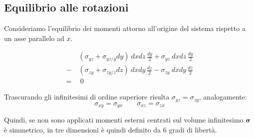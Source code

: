 \subsection*{Equilibrio alle rotazioni}

Consideriamo l'equilibrio dei momenti attorno all'origine del sistema rispetto a un asse parallelo ad $x$.

\begin{align*}
&(\sigma_{yz} + \sigma_{yz/y} dy) \ dx dz\, \frac{dy}{2} + \sigma_{yz}\ dx dz\, \frac{dy}{2}  \\
- \ &(\sigma_{zy} + \sigma_{zy/z} dz)\ dx dy\, \frac{dz}{2} - \sigma_{zy}\ dx dy\, \frac{dz}{2}  \\
  =& \ 0
\end{align*}

Trascurando gli infinitesimi di ordine superiore risulta $\sigma_{yz} = \sigma_{zy}$, analogamente:
\begin{equation*}
\sigma_{xy} = \sigma_{yx}   \quad\quad \sigma_{xz} = \sigma_{zx}
\end{equation*}

Quindi, se non sono applicati momenti esterni centrati sul volume infinitesimo $\boldsymbol{\sigma}$ è simmetrico, in tre dimensioni è quindi definito da 6 gradi di libertà.
